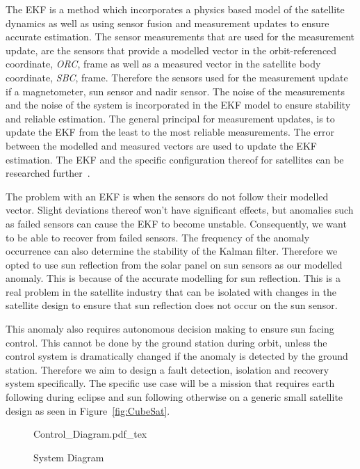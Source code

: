 \documentclass[letterpaper, 10 pt, conference]{ieeeconf}  %
\begin{document}
The EKF is a method which incorporates a physics based model of the satellite dynamics as well as using sensor fusion and measurement updates to ensure accurate estimation. The sensor measurements that are used for the measurement update, are the sensors that provide a modelled vector in the orbit-referenced coordinate, \emph{ORC}, frame as well as a measured vector in the satellite body coordinate, \emph{SBC}, frame. Therefore the sensors used for the measurement update if a magnetometer, sun sensor and nadir sensor. The noise of the measurements and the noise of the system is incorporated in the EKF model to ensure stability and reliable estimation. The general principal for measurement updates, is to update the EKF from the least to the most reliable measurements. The error between the modelled and measured vectors are used to update the EKF estimation. The EKF and the specific configuration thereof for satellites can be researched further~\cite{JansevanVuuren2015}. 

The problem with an EKF is when the sensors do not follow their modelled vector. Slight deviations thereof won't have significant effects, but anomalies such as failed sensors can cause the EKF to become unstable. Consequently, we want to be able to recover from failed sensors. The frequency of the anomaly occurrence can also determine the stability of the Kalman filter. Therefore we opted to use sun reflection from the solar panel on sun sensors as our modelled anomaly. This is because of the accurate modelling for sun reflection. This is a real problem in the satellite industry that can be isolated with changes in the satellite design to ensure that sun reflection does not occur on the sun sensor.

This anomaly also requires autonomous decision making to ensure sun facing control. This cannot be done by the ground station during orbit, unless the control system is dramatically changed if the anomaly is detected by the ground station. Therefore we aim to design a fault detection, isolation and recovery system specifically. The specific use case will be a mission that requires earth following during eclipse and sun following otherwise on a generic small satellite design as seen in Figure~\ref{fig:CubeSat}.

\begin{figure*}[h!b!t]
	\centering
	\def\svgwidth{14cm}
	{Control_Diagram.pdf_tex}
	\caption{System Diagram}
	\label{fig:System_Diagram}
\end{figure*}
\end{document}
